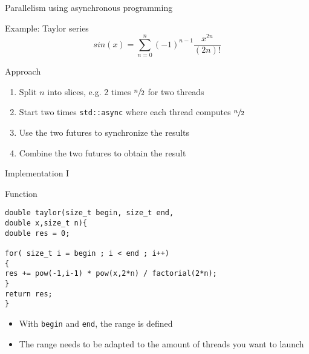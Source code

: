 \documentclass[\classoption]{beamer}
\begin{document}
\begin{frame}{Parallelism using asynchronous programming}

\begin{block}{Example: Taylor series}
$$
sin(x) = \sum\limits_{n=0}^n (-1)^{n-1} \frac{x^{2n}}{(2n)!} 
$$
\end{block}

\begin{block}{Approach}
\begin{enumerate}
\item Split $n$ into slices, e.g. 2 times $\sfrac{n}{2}$ for two threads
\item Start two times \lstinline|std::async| where each thread computes $\sfrac{n}{2}$
\item Use the two futures to synchronize the results
\item Combine the two futures to obtain the result
\end{enumerate}
\end{block}

\end{frame}

\begin{frame}[fragile]{Implementation I}

\begin{block}{Function}
\begin{lstlisting}
double taylor(size_t begin, size_t end, 
double x,size_t n){
double res = 0;

for( size_t i = begin ; i < end ; i++)
{
res += pow(-1,i-1) * pow(x,2*n) / factorial(2*n);
} 
return res;
}

\end{lstlisting}
\end{block}

\begin{itemize}
\item With \lstinline|begin| and \lstinline|end|, the range is defined
\item The range needs to be adapted to the amount of threads you want to launch
\end{itemize}
\end{frame}
\end{document}
